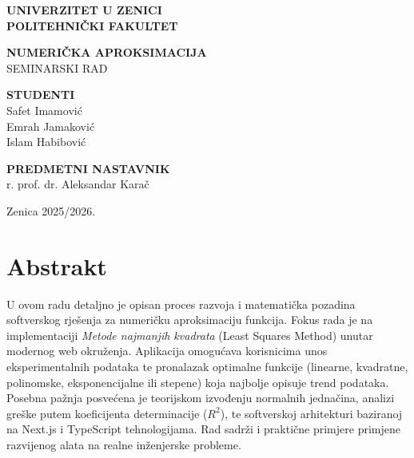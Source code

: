 \documentclass[12pt, a4paper]{article}
\begin{document}
\begin{titlepage}
    \thispagestyle{empty}
    \begin{center}
    \textbf{UNIVERZITET U ZENICI} \\
    \textbf{POLITEHNIČKI FAKULTET}
    \end{center}

    \vspace{6cm}

    \begin{center}
        \Large
        \textbf{NUMERIČKA APROKSIMACIJA} \\[0.3cm]
        \normalsize
        SEMINARSKI RAD
    \end{center}

    \vspace{8cm}

    \noindent
    \begin{minipage}[t]{0.45\textwidth}
        \textbf{STUDENTI} \\[0.3cm]
        Safet Imamović \\
        Emrah Jamaković \\
        Islam Habibović
    \end{minipage}
    \hfill
    \begin{minipage}[t]{0.45\textwidth}
        \raggedleft
        \textbf{PREDMETNI NASTAVNIK} \\[0.3cm]
        r. prof. dr. Aleksandar Karač
    \end{minipage}

    \vfill

    \begin{center}
        Zenica 2025/2026.
    \end{center}

\end{titlepage}

\section*{Abstrakt}
U ovom radu detaljno je opisan proces razvoja i matematička pozadina softverskog rješenja za numeričku aproksimaciju funkcija. Fokus rada je na implementaciji \textit{Metode najmanjih kvadrata} (Least Squares Method) unutar modernog web okruženja. Aplikacija omogućava korisnicima unos eksperimentalnih podataka te pronalazak optimalne funkcije (linearne, kvadratne, polinomske, eksponencijalne ili stepene) koja najbolje opisuje trend podataka. Posebna pažnja posvećena je teorijskom izvođenju normalnih jednačina, analizi greške putem koeficijenta determinacije ($R^2$), te softverskoj arhitekturi baziranoj na Next.js i TypeScript tehnologijama. Rad sadrži i praktične primjere primjene razvijenog alata na realne inženjerske probleme.
\end{document}
